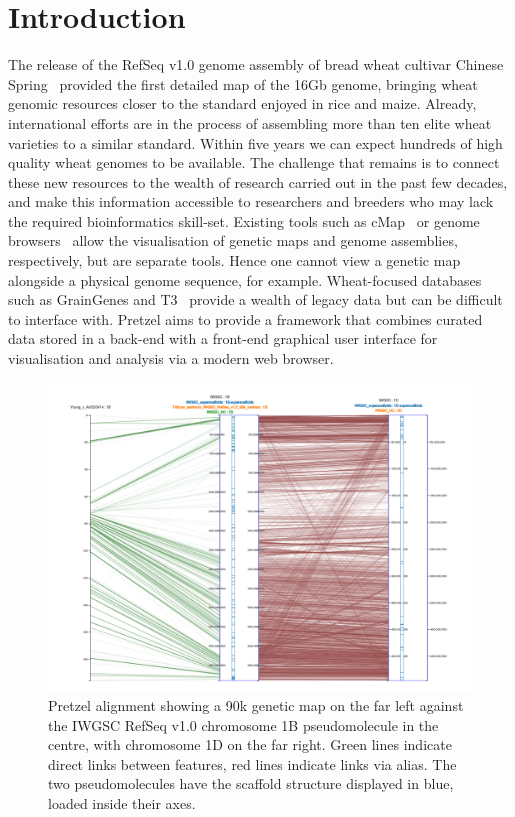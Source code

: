 \documentclass{bioinfo}
\begin{document}
\section{Introduction}

The release of the RefSeq v1.0 genome assembly of bread wheat cultivar Chinese
Spring~\citep{IWGSC2018} provided the first detailed map of the 16Gb genome, bringing wheat genomic
resources closer to the standard enjoyed in rice and maize. 
%
Already, international efforts are in the process of assembling more than ten elite wheat varieties
to a similar standard. 
%
Within five years we can expect hundreds of high quality wheat genomes to be available. 
%
The challenge that remains is to connect these new resources to the wealth of research carried out
in the past few decades, and make this information accessible to researchers and breeders who may
lack the required bioinformatics skill-set.
%
Existing tools such as cMap~\citep{fang2003cmap} or genome
browsers~\citep{Stein2013GBrowse,Buels2016JBrowse} allow the visualisation of genetic maps and genome
assemblies, respectively, but are separate tools. Hence one cannot view a genetic map alongside a
physical genome sequence, for example. 
%
Wheat-focused databases such as GrainGenes and T3~\citep{Blake2016T3} provide a wealth of legacy
data but can be difficult to interface with. 
%
Pretzel aims to provide a framework that combines curated data stored in a back-end with a
front-end graphical user interface for visualisation and analysis via a modern web browser. 
%
\begin{figure}
\centering
  \includegraphics[width=\textwidth]{pretzel.png}
\caption{
  Pretzel alignment showing a 90k genetic map on the far left against the IWGSC RefSeq v1.0 chromosome 1B pseudomolecule in the centre, 
  with chromosome 1D on the far right. 
  Green lines indicate direct links between features, red lines indicate links via alias. 
  The two pseudomolecules have the scaffold structure displayed in blue, loaded inside their axes.
}
\label{fig:01}
\end{figure}
\end{document}
